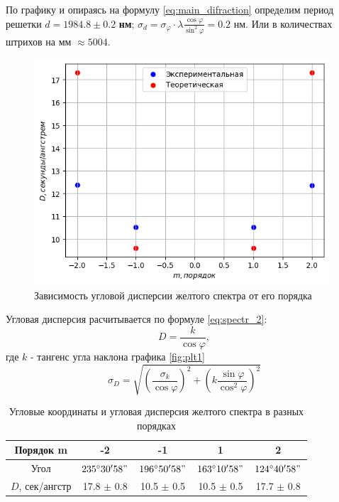 \indent По графику и опираясь на формулу \ref{eq:main_difraction} определим период решетки {\boldmath$d = 1984.8 \pm 0.2$} \textbf{нм}; 
$\sigma_d = \sigma_{\varphi}\cdot \lambda \frac{\cos\varphi}{{\sin^2\varphi}} = 0.2$ нм. Или в количествах штрихов на мм $\approx 5004$.

\begin{figure}[h!]
    \centering
    \includegraphics[width=11cm]{images/plot2.png} 
    \caption{Зависимость угловой дисперсии желтого спектра от его порядка} \label{fig:plt2}
\end{figure}

\indent Угловая дисперсия расчитывается по формуле \ref{eq:spectr_2}: $$D = \frac{k}{\cos \varphi},$$ где $k$ - тангенс угла наклона графика \ref{fig:plt1}
$$\sigma_D = \sqrt{\left (\frac{\sigma_k}{\cos\varphi} \right )^2 + \left (k\frac{\sin\varphi}{\cos^2\varphi}\right )^2}$$

\begin{table}[h!]
    \centering
    \begin{tabular}{|c|c|c|c|c|}
        \hline
        Порядок m & -2 & -1 & 1 & 2 \\\hline
        Угол  & $235^{\circ}30'58"$ & $196^{\circ}50'58"$ & $163^{\circ}10'58"$ & $124^{\circ}40'58"$ \\\hline
        $D$, сек/ангстр & 17.8 $\pm$ 0.8 & 10.5 $\pm$ 0.5& 10.5 $\pm$ 0.5& 17.7 $\pm$ 0.8\\\hline
    \end{tabular}
    \caption{Угловые координаты и угловая дисперсия желтого спектра в разных порядках}
\end{table}

